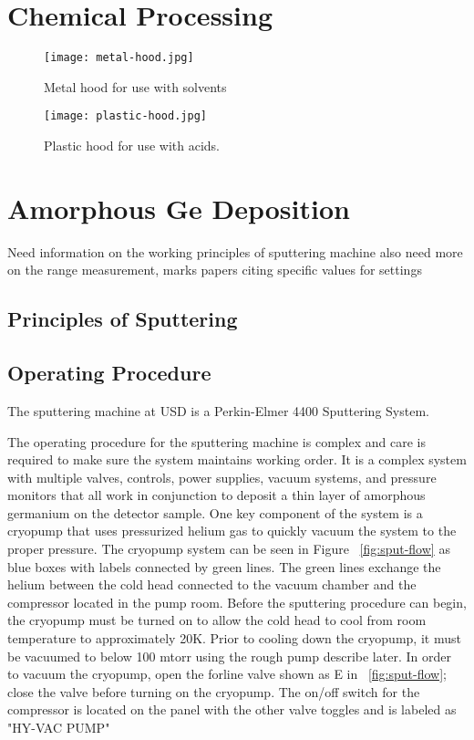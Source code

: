 \section{Chemical Processing}

\begin{figure}[htpb]
\centering
\texttt{[image: metal-hood.jpg]}
\caption{Metal hood for use with solvents}
\label{fig:metalhood}
\end{figure}


\begin{figure}[htpb]
\centering
\texttt{[image: plastic-hood.jpg]}
\caption{Plastic hood for use with acids.}
\label{fig:plastichood}
\end{figure}



\section{Amorphous Ge Deposition}

Need information on the working principles of sputtering machine
also need more on the range measurement, marks papers citing specific values for settings 
\subsection{Principles of Sputtering}

\subsection{Operating Procedure}
The sputtering machine at USD is a Perkin-Elmer 4400 Sputtering System.

The operating procedure for the sputtering machine is complex and care is required to make sure the system maintains working order.
It is a complex system with multiple valves, controls, power supplies, vacuum systems, and pressure monitors that all work in conjunction to deposit a thin layer of amorphous germanium on the detector sample.
One key component of the system is a cryopump that uses pressurized helium gas to quickly vacuum the system to the proper pressure.
The cryopump system can be seen in Figure ~\ref{fig:sput-flow} as blue boxes with labels connected by green lines.
The green lines exchange the helium between the cold head connected to the vacuum chamber and the compressor located in the pump room.
Before the sputtering procedure can begin, the cryopump must be turned on to allow the cold head to cool from room temperature to approximately 20K.
Prior to cooling down the cryopump, it must be vacuumed to below 100 mtorr using the rough pump describe later.
In order to vacuum the cryopump, open the forline valve shown as E in ~\ref{fig:sput-flow}; close the valve before turning on the cryopump.
The on/off switch for the compressor is located on the panel with the other valve toggles and is labeled as "HY-VAC PUMP"

